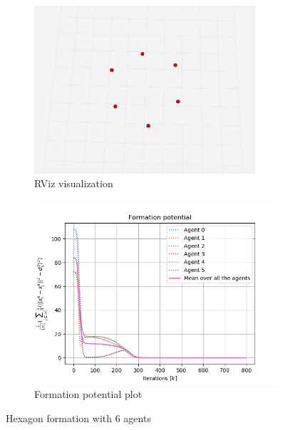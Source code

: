 \documentclass[a4paper,11pt,oneside]{book}
\begin{document}
\begin{figure}
\centering
	\begin{subfigure}{0.49\textwidth}	
	\includegraphics[width=0.9\textwidth]{hexagon_rviz.png}
	\caption{RViz visualization}
	\end{subfigure}
\hfill
	\begin{subfigure}{0.49\textwidth}	
	\includegraphics[width=\textwidth]{Formation_potential_hexagon.png}
	\caption{Formation potential plot}
	\end{subfigure}
\caption{Hexagon formation with $6$ agents}
\label{Hexagon}
\end{figure}
\end{document}
